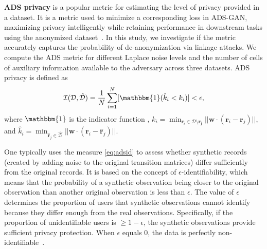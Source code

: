 \documentclass{article}
\begin{document}
\textbf{ADS privacy} is a popular metric for estimating the level of privacy provided in a dataset. It is a metric used to minimize a corresponding loss in ADS-GAN, maximizing privacy intelligently while retaining performance in downstream tasks using the anonymized dataset~\cite{Yoon2020}. In this study, we investigate if the metric accurately captures the probability of de-anonymization via linkage attacks. We compute the ADS metric for different Laplace noise levels and the number of cells of auxiliary information available to the adversary across three datasets. ADS privacy is defined as
\begin{equation}\label{eq:adsid}
\mathcal{I}(\mathcal{D}, \mathcal{\hat{D}}) = \frac{1}{N}\sum_{i=1}^N[\mathbbm{1}(\hat{k}_i < k_i)] < \epsilon,
\end{equation}
where $\mathbbm{1}$ is the indicator function%
, $k_i = \min_{\mathbf{r}_i \in \mathcal{D} \setminus \mathbf{r_j}} || \mathbf{w} \cdot (\mathbf{r}_i-\mathbf{r}_j)||$, and $\hat{k}_i = \min_{\mathbf{\hat{r}}_j \in \mathcal{\mathcal{\hat{D}}}} || \mathbf{w} \cdot (\mathbf{r}_i-\mathbf{\hat{r}}_j)||$.

One typically uses the measure \ref{eq:adsid} to assess whether synthetic records (created by adding noise to the original transition matrices) differ sufficiently from the original records. It is based on the concept of $\epsilon$-identifiability, which means that the probability of a synthetic observation being closer to the original observation than another original observation is less than $\epsilon$. The value of $\epsilon$ determines the proportion of users that synthetic observations cannot identify because they differ enough from the real observations. Specifically, if the proportion of unidentifiable users is $\geq 1 - \epsilon$, the synthetic observations provide sufficient privacy protection. When $\epsilon$ equals 0, the data is perfectly non-identifiable~\citep{Yoon2020}.
\end{document}
